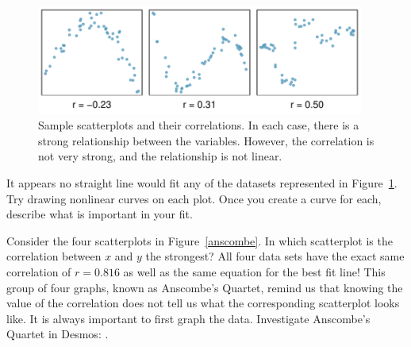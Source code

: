 \begin{figure}[h]
   \centering
   \includegraphics[width=0.96\textwidth]{ch_regr_simple_linear/figures/posNegCorPlots/corForNonLinearPlots}
   \caption{Sample scatterplots and their correlations. In each case, there is a strong relationship between the variables. However, the correlation is not very strong, and the relationship is not linear.}
   \label{corForNonLinearPlots}
\end{figure}

\begin{exercisewrap}
\begin{nexercise}
It appears no straight line would fit any of the datasets represented in Figure~\ref{corForNonLinearPlots}. Try drawing nonlinear curves on each plot. Once you create a curve for each, describe what is important in your fit.\footnotemark 
{}
\end{nexercise}
\end{exercisewrap}

\D{\newpage}
 
\begin{examplewrap}
\begin{nexample}{Consider the four scatterplots in Figure~\ref{anscombe}.  In which scatterplot is the correlation between $x$ and $y$ the strongest?}
All four data sets have the exact same correlation of $r = 0.816$ as well as the same equation for the best fit line!  This group of four graphs, known as Anscombe's Quartet, remind us that knowing the value of the correlation does not tell us what the corresponding scatterplot looks like.  It is always important to first graph the data.  Investigate Anscombe's Quartet in Desmos: .
\end{nexample}
\end{examplewrap}

